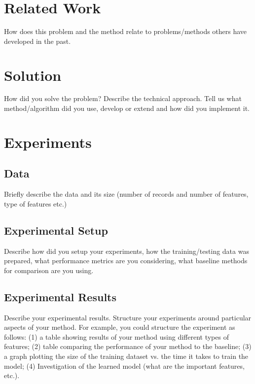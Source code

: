\documentclass[letterpaper,12pt]{article}
\begin{document}
  \section{Related Work}

  How does this problem and the method relate to problems/methods others
  have developed in the past.


  \section{Solution}

  How did you solve the problem? Describe the technical approach. Tell us
  what method/algorithm did you use, develop or extend and how did you
  implement it.


  \section{Experiments}

  \subsection{Data} Briefly describe the data and its size (number of
  records and number of features, type of features etc.)

  \subsection{Experimental Setup} Describe how did you setup your
  experiments, how the training/testing data was prepared, what performance
  metrics are you considering, what baseline methods for comparison are you
  using.

  \subsection{Experimental Results} Describe your experimental results.
  Structure your experiments around particular aspects of your method. For
  example, you could structure the experiment as follows: (1) a table
  showing results of your method using different types of features; (2)
  table comparing the performance of your method to the baseline; (3) a
  graph plotting the size of the training dataset vs. the time it takes to
  train the model; (4) Investigation of the learned model (what are the
  important features, etc.). \cite{santos2009}
\end{document}
